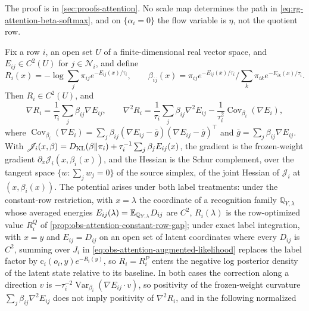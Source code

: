 The proof is in \cref{sec:proofs-attention}.
No scale map determines the path in \eqref{eq:rg-attention-beta-softmax}, and
on \(\{\alpha_i=0\}\) the flow variable is \(\eta\), not the quotient row.

Fix a row \(i\), an open set \(U\) of a finite-dimensional real vector space,
and \(E_{ij}\in C^2(U)\) for \(j\in\mathcal N_i\), and define
\begin{equation}
R_i(x)=-\log\sum_j\pi_{ij}e^{-E_{ij}(x)/\tau_i},
\qquad
\beta_{ij}(x)=\pi_{ij}e^{-E_{ij}(x)/\tau_i}\Big/\sum_k\pi_{ik}e^{-E_{ik}(x)/\tau_i}.
\label{eq:obs-attention-reduced-potential}
\end{equation}
Then \(R_i\in C^2(U)\), and
\begin{equation}
\nabla R_i=\frac1{\tau_i}\sum_j\beta_{ij}\nabla E_{ij},
\qquad
\nabla^2R_i=\frac1{\tau_i}\sum_j\beta_{ij}\nabla^2E_{ij}
-\frac1{\tau_i^2}\operatorname{Cov}_{\beta_i}(\nabla E_i),
\label{eq:obs-attention-reduced-hessian}
\end{equation}
where \(\operatorname{Cov}_{\beta_i}(\nabla E_i)
=\sum_j\beta_{ij}(\nabla E_{ij}-\bar g)(\nabla E_{ij}-\bar g)^\top\) and
\(\bar g=\sum_j\beta_{ij}\nabla E_{ij}\). With
\(\mathscr J_i(x,\beta)=D_{\mathrm{KL}}(\beta\Vert\pi_i)+\tau_i^{-1}\sum_j\beta_jE_{ij}(x)\),
the gradient is the frozen-weight gradient
\(\partial_x\mathscr J_i(x,\beta_i(x))\), and the Hessian is the Schur
complement, over the tangent space \(\{w:\sum_jw_j=0\}\) of the source simplex,
of the joint Hessian of \(\mathscr J_i\) at \((x,\beta_i(x))\). The potential
arises under both label treatments: under the constant-row restriction, with
\(x=\lambda\) the coordinate of a recognition family \(\mathbb Q_{Y,\lambda}\)
whose averaged energies \(E_{ij}(\lambda)=\mathbb E_{\mathbb Q_{Y,\lambda}}D_{ij}\)
are \(C^2\), \(R_i(\lambda)\) is the row-optimized value \(R_i^Q\) of
\cref{prop:obs-attention-constant-row-gap}; under exact label integration, with
\(x=y\) and \(E_{ij}=D_{ij}\) on an open set of latent coordinates where every
\(D_{ij}\) is \(C^2\), summing over \(J_i\) in
\eqref{eq:obs-attention-augmented-likelihood} replaces the label factor by
\(\mathrm c_i(o_i,y)e^{-R_i(y)}\), so \(R_i=R_i^P\) enters the negative log
posterior density of the latent state relative to its baseline. In both cases
the correction along a direction \(v\) is
\(-\tau_i^{-2}\operatorname{Var}_{\beta_i}(\nabla E_{ij}\cdot v)\), so
positivity of the frozen-weight curvature \(\sum_j\beta_{ij}\nabla^2E_{ij}\)
does not imply positivity of \(\nabla^2R_i\), and in the following normalized

